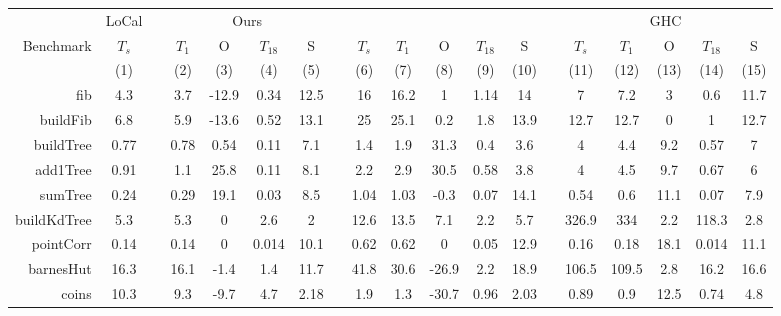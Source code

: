 \begin{figure}
  \footnotesize
  \centering
  \setlength{\tabcolsep}{0.4em}
  \begin{tabular}{@{}r cc cccc r ccccc r ccccc@{}}
    \toprule
    & LoCal & \phantom{} & \multicolumn{4}{c}{Ours} & \phantom{} & \multicolumn{5}{c}{\MPL{}} & \phantom{} & \multicolumn{5}{c}{GHC} \\
    \cmidrule{2-2}
    \cmidrule{4-7}
    \cmidrule{9-13}
    \cmidrule{15-19}
    Benchmark & $T_s$ && $T_1$ & O & $T_{18}$ & S && $T_s$ & $T_1$ & O & $T_{18}$ & S && $T_s$ & $T_1$ & O & $T_{18}$ & S \\
    & (1) && (2) & (3) & (4) & (5) && (6) & (7) & (8) & (9) & (10) && (11) & (12) & (13) & (14) & (15) \\
    \midrule

    fib & 4.3 && 3.7 & -12.9 & 0.34 & 12.5 && 16 & 16.2 & 1 & 1.14 & 14 && 7 & 7.2 & 3 & 0.6 & 11.7 \\

    buildFib  & 6.8 && 5.9 & -13.6 & 0.52 & 13.1 && 25 & 25.1 & 0.2 & 1.8 & 13.9 && 12.7 & 12.7 & 0 & 1 & 12.7 \\

    buildTree & 0.77 && 0.78 & 0.54 & 0.11 & 7.1 && 1.4 & 1.9 & 31.3 & 0.4 & 3.6 && 4 & 4.4 & 9.2 & 0.57 & 7 \\

    add1Tree & 0.91 && 1.1 & 25.8 & 0.11 & 8.1 && 2.2 & 2.9 & 30.5 & 0.58 & 3.8 && 4 & 4.5 & 9.7 & 0.67 & 6 \\

    sumTree & 0.24 && 0.29 & 19.1 & 0.03 & 8.5 && 1.04 & 1.03 & -0.3 & 0.07 & 14.1 && 0.54 & 0.6 & 11.1 & 0.07 & 7.9 \\

    buildKdTree & 5.3 && 5.3 & 0 & 2.6 & 2 && 12.6 & 13.5 & 7.1 & 2.2 & 5.7 && 326.9 & 334 & 2.2 & 118.3 & 2.8 \\

    pointCorr & 0.14 && 0.14 & 0 & 0.014 & 10.1 && 0.62 & 0.62 & 0 & 0.05 & 12.9 && 0.16 & 0.18 & 18.1 & 0.014 & 11.1 \\

    barnesHut & 16.3 && 16.1 & -1.4 & 1.4 & 11.7 && 41.8 & 30.6 & -26.9 & 2.2 & 18.9 && 106.5 & 109.5 & 2.8 & 16.2 & 16.6 \\

    coins & 10.3 && 9.3 & -9.7 & 4.7 & 2.18 && 1.9 & 1.3 & -30.7 & 0.96 & 2.03 && 0.89 & 0.9 & 12.5 & 0.74 & 4.8 \\


\end{tabular}
\end{figure}
